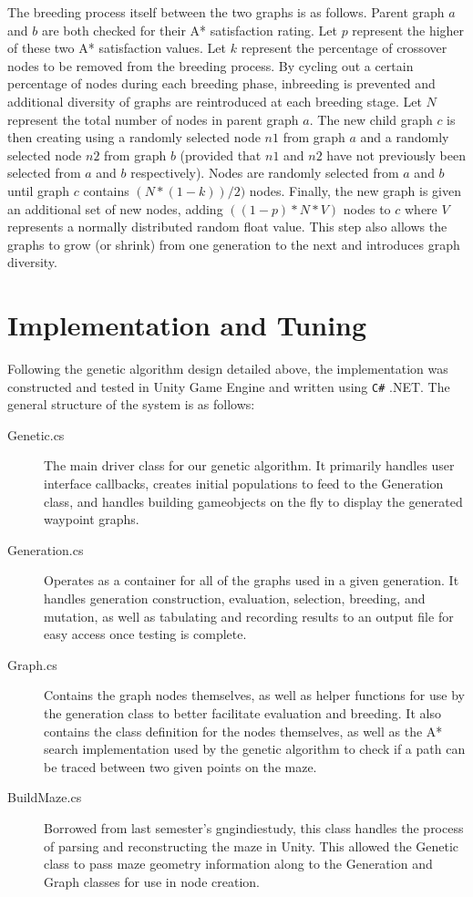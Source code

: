 	The breeding process itself between the two graphs is as follows. Parent graph \(a\) and \(b\) are both checked for their A* satisfaction rating. Let \(p\) represent the higher of these two A* satisfaction values. Let \(k\) represent the percentage of crossover nodes to be removed from the breeding process. By cycling out a certain percentage of nodes during each breeding phase, inbreeding is prevented and additional diversity of graphs are reintroduced at each breeding stage. Let \(N\) represent the total number of nodes in parent graph \(a\). The new child graph \(c\) is then creating using a randomly selected node \(n1\) from graph \(a\) and a randomly selected node \(n2\) from graph \(b\) (provided that \(n1\) and \(n2\) have not previously been selected from \(a\) and \(b\) respectively). Nodes are randomly selected from \(a\) and \(b\) until graph \(c\) contains \((N*(1-k))/2)\) nodes. Finally, the new graph is given an additional set of new nodes, adding \(((1-p)*N * V)\) nodes to \(c\) where \(V\) represents a normally distributed random float value. This step also allows the graphs to grow (or shrink) from one generation to the next and introduces graph diversity.

\section{Implementation and Tuning}

	Following the genetic algorithm design detailed above, the implementation was constructed and tested in Unity Game Engine and written using \texttt{C\#} .NET. The general structure of the system is as follows:	
	\begin{description}
		\item[Genetic.cs] The main driver class for our genetic algorithm. It primarily handles user interface callbacks, creates initial populations to feed to the Generation class, and handles building gameobjects on the fly to display the generated waypoint graphs.
		\item[Generation.cs] Operates as a container for all of the graphs used in a given generation. It handles generation construction, evaluation, selection, breeding, and mutation, as well as tabulating and recording results to an output file for easy access once testing is complete.
		\item[Graph.cs] Contains the graph nodes themselves, as well as helper functions for use by the generation class to better facilitate evaluation and breeding. It also contains the class definition for the nodes themselves, as well as the A* search implementation used by the genetic algorithm to check if a path can be traced between two given points on the maze.
		\item[BuildMaze.cs] Borrowed from last semester's gngindiestudy, this class handles the process of parsing and reconstructing the maze in Unity. This allowed the Genetic class to pass maze geometry information along to the Generation and Graph classes for use in node creation.
	\end{description}
	
